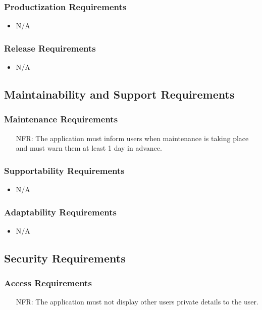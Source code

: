 \documentclass[12pt]{article}
\newcounter{nfrnum} %
\begin{document}
  \subsubsection{Productization Requirements}
    \noindent\begin{itemize}
		\item N/A
    \end{itemize} 
  \subsubsection{Release Requirements}
    \noindent\begin{itemize}
		\item N/A
    \end{itemize}  

\subsection{Maintainability and Support Requirements}
  \subsubsection{Maintenance Requirements}
    \noindent \begin{itemize}
      \item[NFR\refstepcounter{nfrnum}\thenfrnum:]
        The application must inform users when maintenance is taking place and must warn them at least 1 day in advance. 
    \end{itemize}
  \subsubsection{Supportability Requirements}
    \noindent \begin{itemize}
      \item N/A
    \end{itemize}
  \subsubsection{Adaptability Requirements}
    \noindent \begin{itemize}
		\item N/A
    \end{itemize}

\subsection{Security Requirements}
  \subsubsection{Access Requirements}
    \noindent \begin{itemize}
      \item[NFR\refstepcounter{nfrnum}\thenfrnum:]
        The application must not display other users private details to the user.
    \end{itemize}
\end{document}
